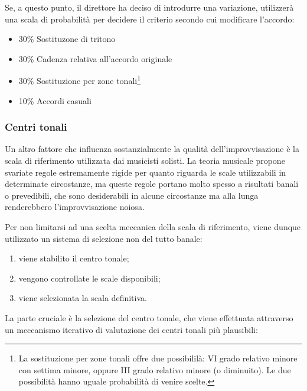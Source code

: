Se, a questo punto, il direttore ha deciso di introdurre una variazione, utilizzerà una scala di probabilità per decidere il criterio secondo cui modificare l'accordo:

\begin{itemize}
\item 30\% Sostituzone di tritono
\item 30\% Cadenza relativa all'accordo originale
\item 30\% Sostituzione per zone tonali\footnote{La sostituzione per zone tonali offre due possibililà: VI grado relativo minore con settima minore, oppure III grado relativo minore (o diminuito). Le due possibilità hanno uguale probabilità di venire scelte.}
\item 10\% Accordi casuali
\end{itemize}

\subsubsection{Centri tonali}\label{dir-tonalZones}
Un altro fattore che influenza sostanzialmente la qualità dell'improvvisazione è la scala di riferimento utilizzata dai musicisti solisti. 
La teoria musicale propone svariate regole estremamente rigide per quanto riguarda le scale utilizzabili in determinate circostanze, ma queste regole portano molto spesso a risultati banali o prevedibili, che sono desiderabili in alcune circostanze ma alla lunga renderebbero l'improvvisazione noiosa.

Per non limitarsi ad una scelta meccanica della scala di riferimento, viene dunque utilizzato un sistema di selezione non del tutto banale:

\begin{enumerate}
\item viene stabilito il centro tonale;
\item vengono controllate le scale disponibili;
\item viene selezionata la scala definitiva.
\end{enumerate}


La parte cruciale è la selezione del centro tonale, che viene effettuata attraverso un meccanismo iterativo di valutazione dei centri tonali più plausibili:


